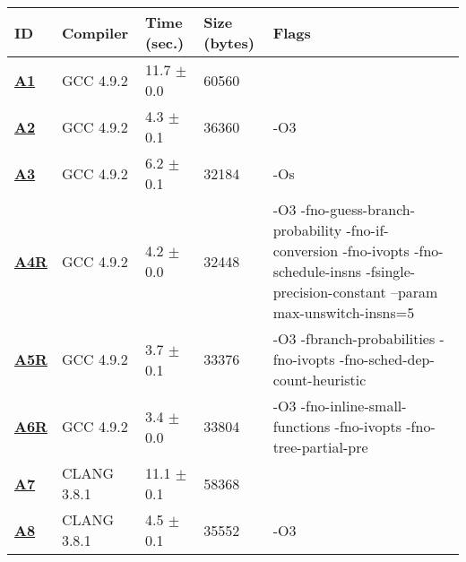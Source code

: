     \begin{tabular}{|l|l|l|l|p{3.2in}|}
     \hline
      \textbf{ID} & \textbf{Compiler} & \textbf{Time (sec.)} & \textbf{Size (bytes)} & \textbf{Flags} \\ 
     \hline
      \textbf{ \href{http://cknowledge.org/repo/web.php?wcid=experiment:f9e6ec8d198c36c3\&subpoint=7cf654adb86fb606}{A1} } &  GCC 4.9.2  &  11.7 $\pm$ 0.0  &  60560  & {\small  }\\
     \hline
      \textbf{ \href{http://cknowledge.org/repo/web.php?wcid=experiment:0b867dd820354a8b\&subpoint=5734f47e4214a783}{A2} } &  GCC 4.9.2  &  4.3 $\pm$ 0.1  &  36360  & {\small -O3 }\\
     \hline
      \textbf{ \href{http://cknowledge.org/repo/web.php?wcid=experiment:b2b26ab783304fc4\&subpoint=7d87c22a2425da10}{A3} } &  GCC 4.9.2  &  6.2 $\pm$ 0.1  &  32184  & {\small -Os }\\
     \hline
      \textbf{ \href{http://cknowledge.org/repo/web.php?wcid=experiment:98688a71f99ac30b\&subpoint=4bcd9dad6b249a79}{A4R} } &  GCC 4.9.2  &  4.2 $\pm$ 0.0  &  32448  & {\small -O3 -fno-guess-branch-probability -fno-if-conversion -fno-ivopts -fno-schedule-insns -fsingle-precision-constant --param max-unswitch-insns=5 }\\
     \hline
      \textbf{ \href{http://cknowledge.org/repo/web.php?wcid=experiment:984b2d8abc3c4415\&subpoint=78c281b4cab897a6}{A5R} } &  GCC 4.9.2  &  3.7 $\pm$ 0.1  &  33376  & {\small -O3 -fbranch-probabilities -fno-ivopts -fno-sched-dep-count-heuristic }\\
     \hline
      \textbf{ \href{http://cknowledge.org/repo/web.php?wcid=experiment:7af17ca204080b57\&subpoint=5a464ecf81b60098}{A6R} } &  GCC 4.9.2  &  3.4 $\pm$ 0.0  &  33804  & {\small -O3 -fno-inline-small-functions -fno-ivopts -fno-tree-partial-pre }\\
     \hline
      \textbf{ \href{http://cknowledge.org/repo/web.php?wcid=experiment:a32e34c31b900930\&subpoint=64ec888d2e6a0669}{A7} } &  CLANG 3.8.1  &  11.1 $\pm$ 0.1  &  58368  & {\small  }\\
     \hline
      \textbf{ \href{http://cknowledge.org/repo/web.php?wcid=experiment:99141b3313132494\&subpoint=a63f42ac837e38d0}{A8} } &  CLANG 3.8.1  &  4.5 $\pm$ 0.1  &  35552  & {\small -O3 }\\
     \hline
    \end{tabular}    